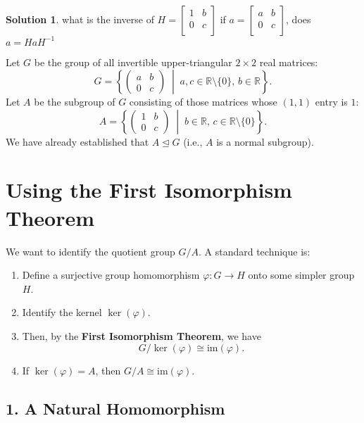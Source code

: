 \documentclass[12pt]{article}
\theoremstyle{definition} %
\newtheorem{solution}{Solution}
\theoremstyle{plain} %
\begin{document}
\begin{solution}
    what is the inverse of $H = \begin{bmatrix}
        1 &  b \\
        0 &  c \\
    \end{bmatrix}$ 
    if $a = \begin{bmatrix}
        a &  b \\
        0 &  c \\
    \end{bmatrix}$, does $a=HaH^{-1}$ 
    
    Let \( G \) be the group of all invertible upper-triangular \( 2 \times 2 \) real matrices:
\[
G = \left\{
\begin{pmatrix}
a & b \\
0 & c
\end{pmatrix}
\;\middle|\; a, c \in \mathbb{R} \setminus \{0\},\, b \in \mathbb{R}
\right\}.
\]
Let \( A \) be the subgroup of \( G \) consisting of those matrices whose \((1,1)\) entry is \( 1 \):
\[
A = \left\{
\begin{pmatrix}
1 & b \\
0 & c
\end{pmatrix}
\;\middle|\; b \in \mathbb{R},\, c \in \mathbb{R} \setminus \{0\}
\right\}.
\]
We have already established that \( A \trianglelefteq G \) (i.e., \( A \) is a normal subgroup).

\section*{Using the First Isomorphism Theorem}

We want to identify the quotient group \( G / A \). A standard technique is:
\begin{enumerate}
    \item Define a surjective group homomorphism \( \varphi : G \to H \) onto some simpler group \( H \).
    \item Identify the kernel \( \ker(\varphi) \).
    \item Then, by the \textbf{First Isomorphism Theorem}, we have
    \[
    G \big/ \ker(\varphi) \cong \mathrm{im}(\varphi).
    \]
    \item If \( \ker(\varphi) = A \), then \( G / A \cong \mathrm{im}(\varphi) \).
\end{enumerate}

\subsection*{1. A Natural Homomorphism}


\end{solution}
\end{document}
